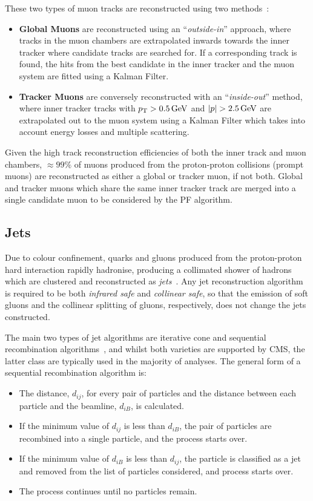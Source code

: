 These two types of muon tracks are reconstructed using two methods~\cite{Chatrchyan:2012xi}:
\begin{itemize}
\item \textbf{Global Muons} are reconstructed using an ``\emph{outside-in}'' approach, where tracks in the muon chambers are extrapolated inwards towards the inner tracker where candidate tracks are searched for.
If a corresponding track is found, the hits from the best candidate in the inner tracker and the muon system are fitted using a Kalman Filter.
\item \textbf{Tracker Muons} are conversely reconstructed with an ``\emph{inside-out}'' method, where inner tracker tracks with $p_{\mathrm{T}} > 0.5\,\text{Ge\hspace{-.08em}V}$ and $|p| > 2.5\,\text{Ge\hspace{-.08em}V}$ are extrapolated out to the muon system using a Kalman Filter which takes into account energy losses and multiple scattering.
\end{itemize}

Given the high track reconstruction efficiencies of both the inner track and muon chambers, $\approx 99\%$ of muons produced from the proton-proton collisions (prompt muons) are reconstructed as either a global or tracker muon, if not both.
Global and tracker muons which share the same inner tracker track are merged into a single candidate muon to be considered by the PF algorithm.

\subsection{Jets}
Due to colour confinement, quarks and gluons produced from the proton-proton hard interaction rapidly hadronise, producing a collimated shower of hadrons which are clustered and reconstructed as \emph{jets}~\cite{Salam:2009jx}.
Any jet reconstruction algorithm is required to be both \emph{infrared safe} and \emph{collinear safe}, \ie so that the emission of soft gluons and the collinear splitting of gluons, respectively, does not change the jets constructed.

The main two types of jet algorithms are iterative cone and sequential recombination algorithms~\cite{Salam:2009jx}, and whilst both varieties are supported by CMS, the latter class are typically used in the majority of analyses.
The general form of a sequential recombination algorithm is:
\begin{itemize}
\item The distance, $d_{ij}$, for every pair of particles and the distance between each particle and the beamline, $d_{iB}$, is calculated.
\item If the minimum value of $d_{ij}$ is less than $d_{iB}$, the pair of particles are recombined into a single particle, and the process starts over.
\item If the minimum value of $d_{iB}$ is less than $d_{ij}$, the particle is classified as a jet and removed from the list of particles considered, and process starts over.
\item The process continues until no particles remain.
\end{itemize}

